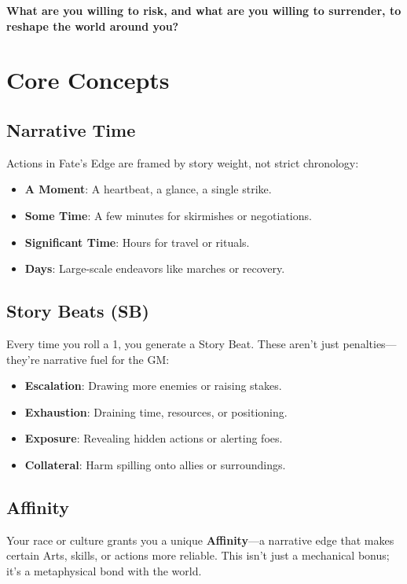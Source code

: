 \documentclass[11pt,twoside]{article}
\begin{document}
\thispagestyle{fancy}

\begin{center}
\textbf{What are you willing to risk, and what are you willing to surrender, to reshape the world around you?}
\end{center}

\vspace{1em}

\tableofcontents

\newpage

\section{Core Concepts}

\subsection{Narrative Time}
Actions in Fate's Edge are framed by story weight, not strict chronology:
\begin{itemize}[leftmargin=*]
    \item \textbf{A Moment}: A heartbeat, a glance, a single strike.
    \item \textbf{Some Time}: A few minutes for skirmishes or negotiations.
    \item \textbf{Significant Time}: Hours for travel or rituals.
    \item \textbf{Days}: Large-scale endeavors like marches or recovery.
\end{itemize}

\subsection{Story Beats (SB)}
Every time you roll a 1, you generate a Story Beat. These aren't just penalties---they're narrative fuel for the GM:
\begin{itemize}[leftmargin=*]
    \item \textbf{Escalation}: Drawing more enemies or raising stakes.
    \item \textbf{Exhaustion}: Draining time, resources, or positioning.
    \item \textbf{Exposure}: Revealing hidden actions or alerting foes.
    \item \textbf{Collateral}: Harm spilling onto allies or surroundings.
\end{itemize}

\subsection{Affinity}
Your race or culture grants you a unique \textbf{Affinity}---a narrative edge that makes certain Arts, skills, or actions more reliable. This isn't just a mechanical bonus; it's a metaphysical bond with the world.
\end{document}
